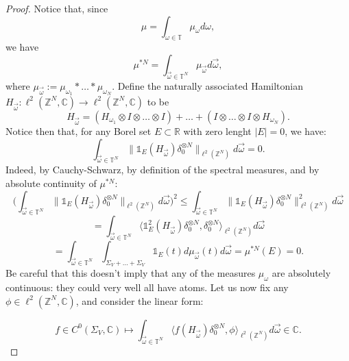 \documentclass[a4paper]{article}
\theoremstyle{definition}
\begin{document}
\begin{proof}
Notice that, since $$\mu = \int_{\omega \in \mathbb{T}} \mu_\omega d\omega,$$ we have $$\mu^{*N} = \int_{\vec{\omega} \in \mathbb{T}^N} \mu_{\vec{\omega}} d\vec{\omega} ,$$
where $\mu_{\vec{\omega}} := \mu_{\omega_1} * \dots * \mu_{\omega_N}$. Define the naturally associated Hamiltonian $H_{\vec{\omega}} : \ell^2(\mathbb{Z}^N,\mathbb{C}) \longrightarrow \ell^2(\mathbb{Z}^N,\mathbb{C}) $ to be
$$ H_{\vec{\omega}} = (H_{\omega_1} \otimes I \otimes \dots \otimes I) + \dots + (I \otimes \dots \otimes I \otimes H_{\omega_N}) .$$
Notice then that, for any Borel set $E\subset \mathbb{R}$ with zero lenght $|E|=0$, we have:
$$ \int_{\vec{\omega} \in \mathbb{T}^N} \| \mathbb{1}_{E}(H_{\vec{\omega}}) \delta_0^{\otimes N} \|_{\ell^2(\mathbb{Z}^N)} d\vec{\omega} = 0.  $$
Indeed, by Cauchy-Schwarz, by definition of the spectral measures, and by absolute continuity of $\mu^{*N}$:
$$  \Big(\int_{\vec{\omega} \in \mathbb{T}^N} \| \mathbb{1}_{E}(H_{\vec{\omega}}) \delta_0^{\otimes N} \|_{\ell^2(\mathbb{Z}^N)} d\vec{\omega}\Big)^2 \leq \int_{\vec{\omega} \in \mathbb{T}^N} \| \mathbb{1}_{E}(H_{\vec{\omega}}) \delta_0^{\otimes N} \|_{\ell^2(\mathbb{Z}^N)}^2 d\vec{\omega} $$
$$ = \int_{\vec{\omega} \in \mathbb{T}^N} \langle \mathbb{1}_{E}^2(H_{\vec{\omega}}) \delta_0^{\otimes N} ,\delta_0^{\otimes N} \rangle_{\ell^2(\mathbb{Z}^N)} d\vec{\omega} $$
$$ = \int_{\vec{\omega} \in \mathbb{T}^N} \int_{\Sigma_V+\dots +\Sigma_V} \mathbb{1}_E(t) d\mu_{\vec{\omega}}(t) d\vec{\omega} = \mu^{*N}(E)=0. $$
Be careful that this doesn't imply that any of the measures $\mu_\omega$ are absolutely continuous: they could very well all have atoms.
Let us now fix any $\phi \in \ell^2(\mathbb{Z}^N,\mathbb{C})$, and consider the linear form:

$$ f \in C^0(\Sigma_V,\mathbb{C}) \longmapsto \int_{\vec{\omega} \in \mathbb{T}^N} \langle f(H_{\vec{\omega}}) \delta_0^{\otimes N} ,\phi \rangle_{\ell^2(\mathbb{Z}^N)} d\vec{\omega} \in \mathbb{C}.$$


\end{proof}
\end{document}
